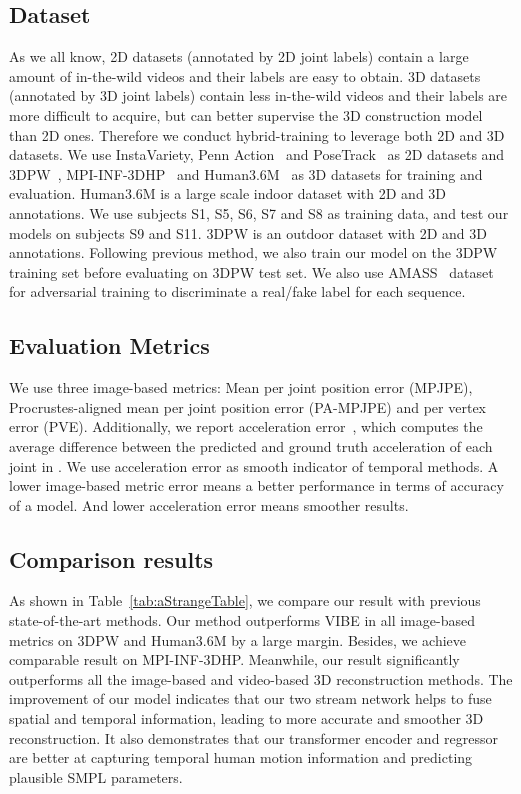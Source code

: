 \documentclass[10pt,twocolumn,letterpaper]{article}
\begin{document}
\subsection{Dataset}
As we all know, 2D datasets (annotated by 2D joint labels) contain a large amount of in-the-wild videos and their labels are easy to obtain. 3D datasets (annotated by 3D joint labels) contain less in-the-wild videos and their labels are more difficult to acquire, but can better supervise the 3D construction model than 2D ones. Therefore we conduct hybrid-training to leverage both 2D and 3D datasets. We use InstaVariety\cite{kanazawa2019learning}, Penn Action~\cite{zhang2013actemes} and PoseTrack~\cite{andriluka2018posetrack} as 2D datasets and 3DPW~\cite{von2018recovering}, MPI-INF-3DHP~\cite{mehta2017monocular} and Human3.6M~\cite{ionescu2013human3} as 3D datasets for training and evaluation.
Human3.6M is a large scale indoor dataset with 2D and 3D annotations. We use subjects S1, S5, S6, S7 and S8 as training data, and test our models on subjects S9 and S11.
3DPW is an outdoor dataset with 2D and 3D annotations. Following previous method, we also train our model on the 3DPW training set before evaluating on 3DPW test set. We also use AMASS~\cite{mahmood2019amass} dataset for adversarial training to discriminate a real/fake label for each sequence.

\subsection{Evaluation Metrics}
We use three image-based metrics: Mean per joint position error (MPJPE), Procrustes-aligned mean per joint position error (PA-MPJPE) and per vertex error
(PVE). Additionally, we report acceleration error~\cite{kanazawa2019learning}, which computes the average difference between the predicted and ground truth acceleration of each joint in . We use acceleration error as smooth indicator of temporal methods. A lower image-based metric error means a better performance in terms of accuracy of a model. And lower acceleration error means smoother results. 

\subsection{Comparison results}
As shown in Table~\ref{tab:aStrangeTable}, we compare our result with previous state-of-the-art methods. Our method outperforms VIBE in all image-based metrics on 3DPW and Human3.6M by a large margin. Besides, we achieve comparable result on MPI-INF-3DHP. Meanwhile, our result significantly outperforms all the image-based and video-based 3D reconstruction methods. The improvement of our model indicates that our two stream network helps to fuse spatial and temporal information, leading to more accurate and smoother 3D reconstruction. It also demonstrates that our transformer encoder and regressor are better at capturing temporal human motion information and predicting plausible SMPL parameters.\par
\end{document}
